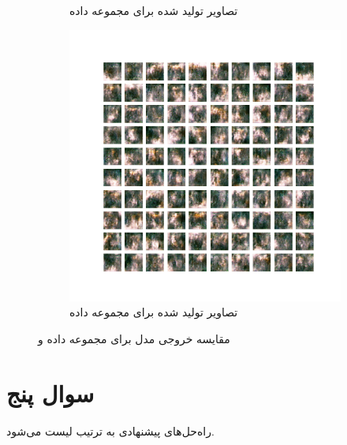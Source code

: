 \documentclass[12pt, a4paper]{book}
\begin{document}
\begin{figure}[h]
\begin{subfigure}{0.4\linewidth}
        \caption{تصاویر تولید شده برای مجموعه داده }
    \end{subfigure}
    \hfill
    \begin{subfigure}{0.4\linewidth}
        \includegraphics[width=\linewidth]{images/dcgan/nlayer1/generated_img_30.png}
        \caption{تصاویر تولید شده برای مجموعه داده }
    \end{subfigure}
    \caption{مقایسه خروجی مدل برای مجموعه داده  و }
    \label{celeba}
\end{figure}

\clearpage

\section*{سوال پنج}

راه‌حل‌های پیشنهادی به ترتیب لیست می‌شود.
\end{document}
